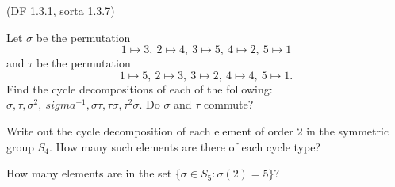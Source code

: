 \begin{problem}{\textsf{(DF 1.3.1, sorta 1.3.7)}}
  \begin{enumalph}
  \item Let $\sigma$ be the permutation
  \[ 1 \mapsto 3,\ 2 \mapsto 4,\ 3 \mapsto 5,\ 4 \mapsto 2,\ 5 \mapsto 1 \]
  and $\tau$ be the permutation
  \[ 1 \mapsto 5,\ 2 \mapsto 3,\ 3 \mapsto 2,\ 4 \mapsto 4,\ 5 \mapsto 1. \]
  Find the cycle decompositions of each of the following: $\sigma,\tau,\sigma^2,\
  sigma^{-1},\sigma\tau,\tau\sigma,\tau^2\sigma$.  Do $\sigma$ and $\tau$ commute?  
  \item Write out the cycle decomposition of each element of order $2$ in the 
  symmetric group $S_4$.  How many such elements are there of each cycle type?  
  \item How many elements are in the set $\{\sigma \in S_5:\sigma(2)=5\}$?
  \end{enumalph}
\end{problem}
\begin{Answer}
  
\end{Answer}
